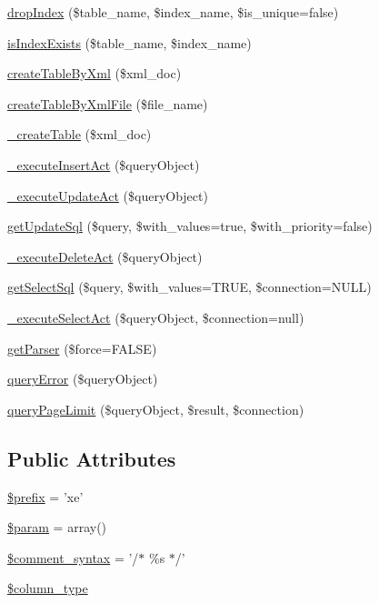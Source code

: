 \begin{DoxyCompactItemize}
\item 
\hyperlink{classDBMssql_a83bea7f71705370699eac384c5f93088}{drop\-Index} (\$table\-\_\-name, \$index\-\_\-name, \$is\-\_\-unique=false)
\item 
\hyperlink{classDBMssql_a17723942b3686527a68b72a1740136c3}{is\-Index\-Exists} (\$table\-\_\-name, \$index\-\_\-name)
\item 
\hyperlink{classDBMssql_a7a3ff51c1a29e47c02f358dc6064d88b}{create\-Table\-By\-Xml} (\$xml\-\_\-doc)
\item 
\hyperlink{classDBMssql_ae136845dee2ecc1bd8fe3a7c535572f4}{create\-Table\-By\-Xml\-File} (\$file\-\_\-name)
\item 
\hyperlink{classDBMssql_a0705365081b34014652f440380c53519}{\-\_\-create\-Table} (\$xml\-\_\-doc)
\item 
\hyperlink{classDBMssql_aa3f04ce5bee8d9e11db7de7293055fef}{\-\_\-execute\-Insert\-Act} (\$query\-Object)
\item 
\hyperlink{classDBMssql_a855a8b1b61f7840ce057f72fa5a39300}{\-\_\-execute\-Update\-Act} (\$query\-Object)
\item 
\hyperlink{classDBMssql_a10dad79ab29a55301ef2327fb27f86aa}{get\-Update\-Sql} (\$query, \$with\-\_\-values=true, \$with\-\_\-priority=false)
\item 
\hyperlink{classDBMssql_a871bd07e7224b27daba828686ee57a8a}{\-\_\-execute\-Delete\-Act} (\$query\-Object)
\item 
\hyperlink{classDBMssql_a37ed6e799c12ecafdea33d6fb0a84f87}{get\-Select\-Sql} (\$query, \$with\-\_\-values=T\-R\-U\-E, \$connection=N\-U\-L\-L)
\item 
\hyperlink{classDBMssql_a819a9181e9f34ce00f6f2d8a273813a6}{\-\_\-execute\-Select\-Act} (\$query\-Object, \$connection=null)
\item 
\hyperlink{classDBMssql_aa67e4dcd0df911a7c4e6325f21f0fb04}{get\-Parser} (\$force=F\-A\-L\-S\-E)
\item 
\hyperlink{classDBMssql_adeea6fd6090140a4b81051c5ff68cdfe}{query\-Error} (\$query\-Object)
\item 
\hyperlink{classDBMssql_a5a63ce969c396b656ac50e2251e798b9}{query\-Page\-Limit} (\$query\-Object, \$result, \$connection)
\end{DoxyCompactItemize}
\subsection*{Public Attributes}
\begin{DoxyCompactItemize}
\item 
\hyperlink{classDBMssql_a733cd192b424b5a66ea14e3e62391844}{\$prefix} = 'xe'
\item 
\hyperlink{classDBMssql_a352ee40852cea6dc20de096486603805}{\$param} = array()
\item 
\hyperlink{classDBMssql_ad095d953d508f44a326586a10c95336d}{\$comment\-\_\-syntax} = '/$\ast$ \%s $\ast$/'
\item 
\hyperlink{classDBMssql_a785e589df00c87bb0003b573aa5d7fee}{\$column\-\_\-type}
\end{DoxyCompactItemize}
